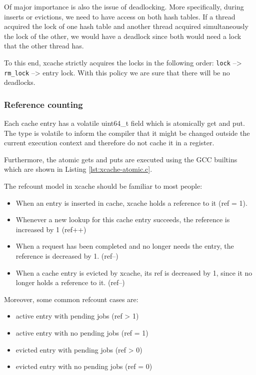 Of major importance is also the issue of deadlocking. More specifically, during 
inserts or evictions, we need to have access on both hash tables. If a thread 
acquired the lock of one hash table and another thread acquired simultaneously 
the lock of the other, we would have a deadlock since both would need a lock 
that the other thread has.

To this end, xcache strictly acquires the locks in the following order: 
\texttt{lock} --> \texttt{rm\_lock} --> entry lock. With this policy we are 
sure that there will be no deadlocks.

\subsubsection{Reference counting}\label{sec:xcache-refcount-imp}

Each cache entry has a volatile uint64\_t field which is atomically get and 
put. The type is volatile to inform the compiler that it might be changed 
outside the current execution context and therefore do not cache it in a 
register.

Furthermore, the atomic gets and puts are executed using the GCC 
builtins\cite{gcc-atomic} which are shown in Listing \ref{lst:xcache-atomic.c}.


The refcount model in xcache should be familiar to most people:

\begin{itemize}
	\item When an entry is inserted in cache, xcache holds a reference to 
		it (ref = 1).
	\item Whenever a new lookup for this cache entry succeeds, the reference 
		is increased by 1 (ref++)
	\item When a request has been completed and no longer needs the entry, 
		the reference is decreased by 1. (ref--)
	\item When a cache entry is evicted by xcache, its ref is decreased by 
		1, since it no longer holds a reference to it. (ref--)
\end{itemize}

Moreover, some common refcount cases are:

\begin{itemize}
	\item active entry with pending jobs (ref > 1)
	\item active entry with no pending jobs (ref = 1)
	\item evicted entry with pending jobs (ref > 0)
	\item evicted entry with no pending jobs (ref = 0)
\end{itemize}

